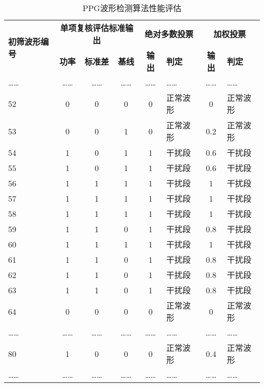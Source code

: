 \begin{table}[htbp]
    \centering
    \caption{\label{tab:detect}PPG波形检测算法性能评估}
    \begin{tabularx}{\linewidth}{X<{\centering}ccccX<{\centering}cX<{\centering}}
    \toprule
    \multirow{2}[4]{*}{\textbf{初筛波形编号}} & \multicolumn{3}{c}{\textbf{单项复核评估标准输出}} & \multicolumn{2}{c}{\textbf{绝对多数投票}} & \multicolumn{2}{c}{\textbf{加权投票}} \\
    \cmidrule{2-8} & \textbf{功率} & \textbf{标准差} & \textbf{基线} & \textbf{输出} & \textbf{判定} & \textbf{输出} & \textbf{判定} \\
    \midrule
    ……    & ……    & ……    & ……    & ……    & ……    & ……    & …… \\
    52    & 0     & 0     & 0     & 0     & 正常波形  & 0     & 正常波形 \\
    53    & 0     & 0     & 1     & 0     & 正常波形  & 0.2   & 正常波形 \\
    54    & 1     & 0     & 1     & 1     & 干扰段   & 0.6   & 干扰段 \\
    55    & 1     & 0     & 1     & 1     & 干扰段   & 0.6   & 干扰段 \\
    56    & 1     & 1     & 1     & 1     & 干扰段   & 1     & 干扰段 \\
    57    & 1     & 1     & 1     & 1     & 干扰段   & 1     & 干扰段 \\
    58    & 1     & 1     & 1     & 1     & 干扰段   & 1     & 干扰段 \\
    59    & 1     & 1     & 0     & 1     & 干扰段   & 0.8   & 干扰段 \\
    60    & 1     & 1     & 1     & 1     & 干扰段   & 1     & 干扰段 \\
    61    & 1     & 1     & 0     & 1     & 干扰段   & 0.8   & 干扰段 \\
    62    & 1     & 1     & 0     & 1     & 干扰段   & 0.8   & 干扰段 \\
    63    & 1     & 1     & 0     & 1     & 干扰段   & 0.8   & 干扰段 \\
    64    & 0     & 0     & 0     & 0     & 正常波形  & 0     & 正常波形 \\
    ……    & ……    & ……    & ……    & ……    & ……    & ……    & …… \\
    80    & 1     & 0     & 0     & 0     & 正常波形  & 0.4   & 正常波形 \\
    ……    & ……    & ……    & ……    & ……    & ……    & ……    & …… \\
    \bottomrule
    \end{tabularx}%
\end{table}%



